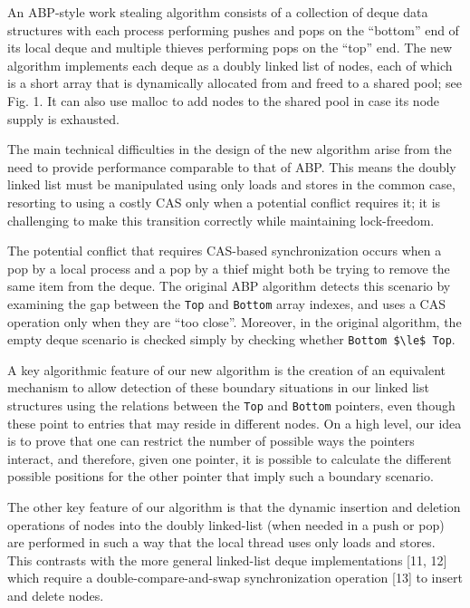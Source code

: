 An ABP-style work stealing algorithm consists of a collection of deque
data structures with each process performing pushes and pops on the
``bottom'' end of its local deque and multiple thieves performing pops
on the ``top'' end. The new algorithm implements each deque as a
doubly linked list of nodes, each of which is a short array that is
dynamically allocated from and freed to a shared pool; see Fig. 1. It
can also use malloc to add nodes to the shared pool in case its node
supply is exhausted.

The main technical difficulties in the design of the new algorithm
arise from the need to provide performance comparable to that of
ABP. This means the doubly linked list must be manipulated using only
loads and stores in the common case, resorting to using a costly CAS
only when a potential conflict requires it; it is challenging to make
this transition correctly while maintaining lock-freedom.

The potential conflict that requires CAS-based synchronization occurs
when a pop by a local process and a pop by a thief might both be
trying to remove the same item from the deque. The original ABP
algorithm detects this scenario by examining the gap between the
\lstinline!Top! and \lstinline!Bottom! array indexes, and uses a CAS
operation only when they are ``too close''. Moreover, in the original
algorithm, the empty deque scenario is checked simply by checking
whether \lstinline!Bottom $\le$ Top!.

A key algorithmic feature of our new algorithm is the creation of an
equivalent mechanism to allow detection of these boundary situations
in our linked list structures using the relations between the
\lstinline!Top! and \lstinline!Bottom! pointers, even though these
point to entries that may reside in different nodes. On a high level,
our idea is to prove that one can restrict the number of possible ways
the pointers interact, and therefore, given one pointer, it is
possible to calculate the different possible positions for the other
pointer that imply such a boundary scenario.

The other key feature of our algorithm is that the dynamic insertion
and deletion operations of nodes into the doubly linked-list (when
needed in a push or pop) are performed in such a way that the local
thread uses only loads and stores. This contrasts with the more
general linked-list deque implementations [11, 12] which require a
double-compare-and-swap synchronization operation [13] to insert and
delete nodes.

